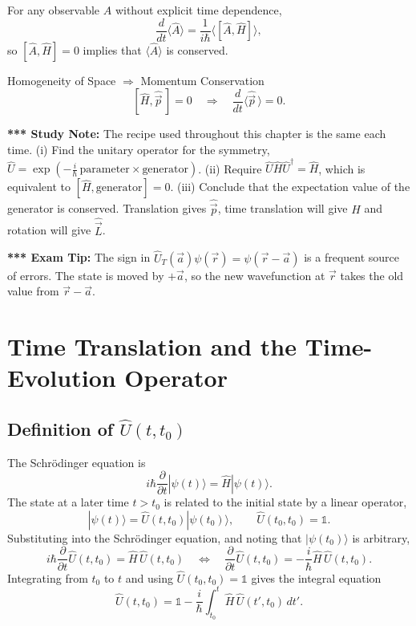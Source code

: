 \documentclass[11pt,a4paper]{article}
\begin{document}
For any observable $\hat A$ without explicit time dependence,
\[
\frac{d}{dt}\langle\hat A\rangle=\frac1{i\hbar}\langle[\hat A,\hat H]\rangle ,
\]
so $[\hat A,\hat H]=0$ implies that $\langle\hat A\rangle$ is conserved.

\begin{thm}{Homogeneity of Space $\Rightarrow$ Momentum Conservation}
\[
[\hat H,\hat{\vec p}\,]=0\quad\Longrightarrow\quad \frac{d}{dt}\langle\hat{\vec p}\,\rangle=0 .
\]
\end{thm}

\textbf{*** Study Note:} The recipe used throughout this chapter is the same each time. (i) Find the unitary operator for the symmetry, $\hat U=\exp(-\tfrac i\hbar\,\text{parameter}\times\text{generator})$. (ii) Require $\hat U\hat H\hat U^\dagger=\hat H$, which is equivalent to $[\hat H,\text{generator}]=0$. (iii) Conclude that the expectation value of the generator is conserved. Translation gives $\hat{\vec p}$, time translation will give $\hat H$ and rotation will give $\hat{\vec L}$.

\textbf{*** Exam Tip:} The sign in $\hat U_T(\vec a)\psi(\vec r)=\psi(\vec r-\vec a)$ is a frequent source of errors. The state is moved by $+\vec a$, so the new wavefunction at $\vec r$ takes the old value from $\vec r-\vec a$.

\section{Time Translation and the Time-Evolution Operator}
\label{sy:sec:time}

\subsection{Definition of \texorpdfstring{$\hat U(t,t_0)$}{U(t,t0)}}
The Schr\"odinger equation is
\[
i\hbar\frac{\partial}{\partial t}|\psi(t)\rangle=\hat H|\psi(t)\rangle .
\]
The state at a later time $t>t_0$ is related to the initial state by a linear operator,
\[
|\psi(t)\rangle=\hat U(t,t_0)|\psi(t_0)\rangle,\qquad \hat U(t_0,t_0)=\mathbb 1 .
\]
Substituting into the Schr\"odinger equation, and noting that $|\psi(t_0)\rangle$ is arbitrary,
\[
i\hbar\frac{\partial}{\partial t}\hat U(t,t_0)=\hat H\,\hat U(t,t_0)
\quad\Longleftrightarrow\quad
\frac{\partial}{\partial t}\hat U(t,t_0)=-\frac i\hbar\hat H\,\hat U(t,t_0).
\]
Integrating from $t_0$ to $t$ and using $\hat U(t_0,t_0)=\mathbb 1$ gives the integral equation
\[
\hat U(t,t_0)=\mathbb 1-\frac i\hbar\int_{t_0}^{t}\hat H\,\hat U(t',t_0)\,dt' .
\]
\end{document}
